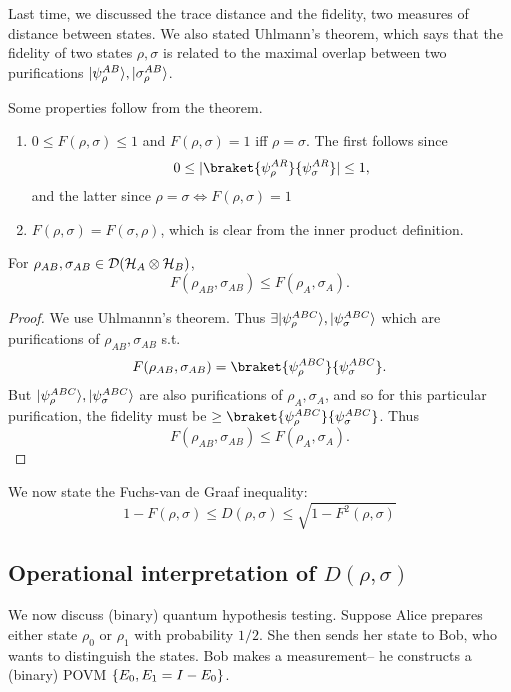 Last time, we discussed the trace distance and the fidelity, two measures of distance between states. We also stated Uhlmann's theorem, which says that the fidelity of two states $\rho,\sigma$ is related to the maximal overlap between two purifications $\lvert\psi_\rho^{AB}\rangle,\lvert\sigma_\rho^{AB}\rangle$.

Some properties follow from the theorem.
\begin{enumerate}
    \item $0\leq F(\rho,\sigma) \leq 1$ and $F(\rho,\sigma)=1$ iff $\rho=\sigma$. The first follows since
    \begin{equation*}
        0\leq \abs{\braket{\psi_\rho^{AR}}
        {\psi_\sigma^{AR}}} \leq 1,
    \end{equation*}
    and the latter since $\rho=\sigma \iff F(\rho,\sigma)=1$
    \item $F(\rho,\sigma)=F(\sigma,\rho)$, which is clear from the inner product definition.
\end{enumerate}
\begin{lem}
    For $\rho_{AB},\sigma_{AB}\in \mathcal{D}(\mathcal H_A\otimes \mathcal H_B)$,
    \begin{equation}
        F(\rho_{AB},\sigma_{AB})\leq F(\rho_A,\sigma_A).
    \end{equation}
\end{lem}
\begin{proof}
    We use Uhlmannn's theorem. Thus $\exists \lvert\psi_\rho^{ABC}\rangle,\lvert\psi_\sigma^{ABC}\rangle$ which are purifications of $\rho_{AB},\sigma_{AB}$ s.t.
    \begin{equation}
        F(\rho_{AB},\sigma_{AB}) =\braket{\psi_\rho^{ABC}}{\psi_\sigma^{ABC}}.
    \end{equation}
    But $\lvert\psi_\rho^{ABC}\rangle,\lvert\psi_\sigma^{ABC}\rangle$ are also purifications of $\rho_A,\sigma_A$, and so for this particular purification, the fidelity must be $\geq \braket{\psi_\rho^{ABC}}{\psi_\sigma^{ABC}}$. Thus
    \begin{equation}
        F(\rho_{AB},\sigma_{AB}) \leq F(\rho_A,\sigma_A).
    \end{equation}
\end{proof}

We now state the Fuchs-van de Graaf inequality:
\begin{equation}
    1-F(\rho,\sigma)\leq D(\rho,\sigma) \leq \sqrt{1-F^2(\rho,\sigma)}
\end{equation}

\subsection*{Operational interpretation of $D(\rho,\sigma)$}
We now discuss (binary) quantum hypothesis testing. Suppose Alice prepares either state $\rho_0$ or $\rho_1$ with probability $1/2$. She then sends her state to Bob, who wants to distinguish the states. Bob makes a measurement-- he constructs a (binary) POVM $\{E_0,E_1=I-E_0\}$.

